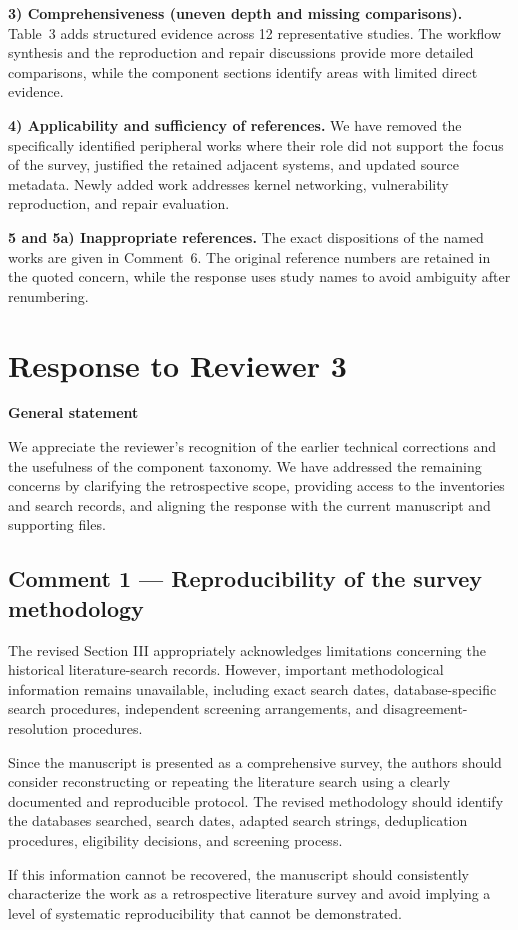 \documentclass[11pt,a4paper]{article}
\begin{document}
\textbf{3) Comprehensiveness (uneven depth and missing comparisons).} Table~3 adds structured evidence across 12 representative studies. The workflow synthesis and the reproduction and repair discussions provide more detailed comparisons, while the component sections identify areas with limited direct evidence.

\textbf{4) Applicability and sufficiency of references.} We have removed the specifically identified peripheral works where their role did not support the focus of the survey, justified the retained adjacent systems, and updated source metadata. Newly added work addresses kernel networking, vulnerability reproduction, and repair evaluation.

\textbf{5 and 5a) Inappropriate references.} The exact dispositions of the named works are given in Comment~6. The original reference numbers are retained in the quoted concern, while the response uses study names to avoid ambiguity after renumbering.

\section{Response to Reviewer 3}

\textbf{General statement}

We appreciate the reviewer's recognition of the earlier technical corrections and the usefulness of the component taxonomy. We have addressed the remaining concerns by clarifying the retrospective scope, providing access to the inventories and search records, and aligning the response with the current manuscript and supporting files.

\subsection{Comment 1 --- Reproducibility of the survey methodology}
\begin{reviewcomment}
The revised Section III appropriately acknowledges limitations concerning the historical literature-search records. However, important methodological information remains unavailable, including exact search dates, database-specific search procedures, independent screening arrangements, and disagreement-resolution procedures.

Since the manuscript is presented as a comprehensive survey, the authors should consider reconstructing or repeating the literature search using a clearly documented and reproducible protocol. The revised methodology should identify the databases searched, search dates, adapted search strings, deduplication procedures, eligibility decisions, and screening process.

If this information cannot be recovered, the manuscript should consistently characterize the work as a retrospective literature survey and avoid implying a level of systematic reproducibility that cannot be demonstrated.
\end{reviewcomment}
\end{document}
